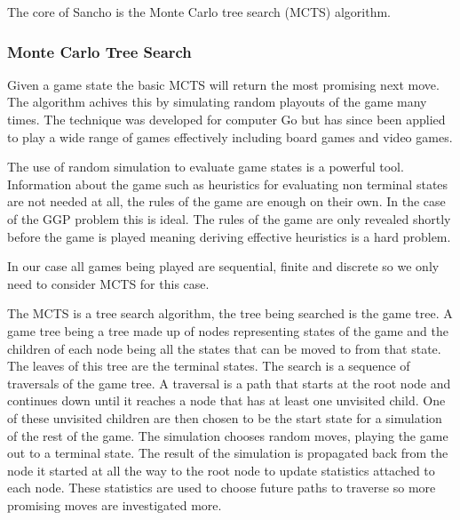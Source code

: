 \documentclass[a4paper,12pt]{report}
\begin{document}
The core of Sancho is the Monte Carlo tree search (MCTS) algorithm.

\subsubsection{Monte Carlo Tree Search}
Given a game state the basic MCTS will return the most promising next move. The algorithm achives this by simulating random playouts of the game many times. The technique was developed for computer Go but has since been applied to play a wide range of games effectively including board games and video games\cite{Silver/MCTS}\cite{Chaslot/MCTS}.

The use of random simulation to evaluate game states is a powerful tool. Information about the game such as heuristics for evaluating non terminal states are not needed at all, the rules of the game are enough on their own. In the case of the GGP problem this is ideal. The rules of the game are only revealed shortly before the game is played meaning deriving effective heuristics is a hard problem.

In our case all games being played are sequential, finite and discrete so we only need to consider MCTS for this case.

The MCTS is a tree search algorithm, the tree being searched is the game tree. A game tree being a tree made up of nodes representing states of the game and the children of each node being all the states that can be moved to from that state. The leaves of this tree are the terminal states. The search is a sequence of traversals of the game tree. A traversal is a path that starts at the root node and continues down until it reaches a node that has at least one unvisited child. One of these unvisited children are then chosen to be the start state for a simulation of the rest of the game. The simulation chooses random moves, playing the game out to a terminal state. The result of the simulation is propagated back from the node it started at all the way to the root node to update statistics attached to each node. These statistics are used to choose future paths to traverse so more promising moves are investigated more.
\end{document}
